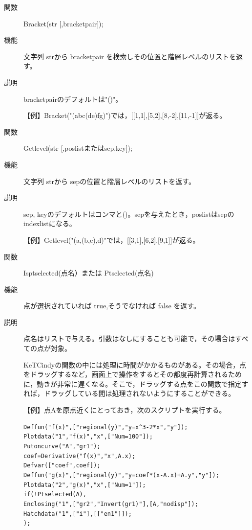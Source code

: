 \documentclass[papersize,a4paper,12pt,uplatex]{jsarticle}
\begin{document}
\begin{description}
\vspace{\baselineskip}

\hypertarget{bracket}{}
\item[関数]Bracket(str [,bracketpair]);
\item[機能]文字列 strから bracketpair を検索しその位置と階層レベルのリストを返す。
\item[説明]bracketpairのデフォルトは"()"。

\vspace{\baselineskip}

【例】Bracket("(abc(de)fg)")では，[[1,1],[5,2],[8,-2],[11,-1]]が返る。

\vspace{\baselineskip}

\hypertarget{getlevel}{}
\item[関数]Getlevel(str [,poslistまたはsep,key]);
\item[機能]文字列 strから sepの位置と階層レベルのリストを返す。
\item[説明]sep, keyのデフォルトはコンマと()。sepを与えたとき，poslistはsepのindexlistになる。

\vspace{\baselineskip}

【例】Getlevel("(a,(b,c),d)"では，[[3,1],[6,2],[9,1]]が返る。

\vspace{\baselineskip}

\hypertarget{isptselected}{}
\item[関数]Isptselected(点名）または Ptselected(点名)
\item[機能]点が選択されていれば true,そうでなければ false を返す。
\item[説明]点名はリストで与える。引数はなしにすることも可能で，その場合はすべての点が対象。

KeTCindyの関数の中には処理に時間がかかるものがある。その場合，点をドラッグするなど，画面上で操作をするとその都度再計算されるために，動きが非常に遅くなる。そこで，ドラッグする点をこの関数で指定すれば，ドラッグしている間は処理されないようにすることができる。

\vspace{\baselineskip}
【例】点Aを原点近くにとっておき，次のスクリプトを実行する。

\verb|Deffun("f(x)",["regional(y)","y=x^3-2*x","y"]);|\\
\verb|Plotdata("1","f(x)","x",["Num=100"]);|\\
\verb|Putoncurve("A","gr1");|\\
\verb|coef=Derivative("f(x)","x",A.x);|\\
\verb|Defvar(["coef",coef]);|\\
\verb|Deffun("g(x)",["regional(y)","y=coef*(x-A.x)+A.y","y"]);|\\
\verb|Plotdata("2","g(x)","x",["Num=1"]);|\\
\verb|if(!Ptselected(A),|\\
\verb|Enclosing("1",["gr2","Invert(gr1)"],[A,"nodisp"]);|\\
\verb|Hatchdata("1",["i"],[["en1"]]);|\\
\verb|);|


\end{description}
\end{document}
